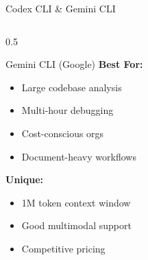 \documentclass[aspectratio=169,11pt]{beamer}
\begin{document}
\begin{frame}{Codex CLI \& Gemini CLI}
\begin{columns}[T]
\begin{column}{0.5\textwidth}
\begin{block}{Gemini CLI (Google)}
                \textbf{Best For:}
                \begin{itemize}
                    \item Large codebase analysis
                    \item Multi-hour debugging
                    \item Cost-conscious orgs
                    \item Document-heavy workflows
                \end{itemize}

                \textbf{Unique:}
                \begin{itemize}
                    \item 1M token context window
                    \item Good multimodal support
                    \item Competitive pricing
                \end{itemize}
            \end{block}
        \end{column}
    \end{columns}

\end{frame}
\end{document}
